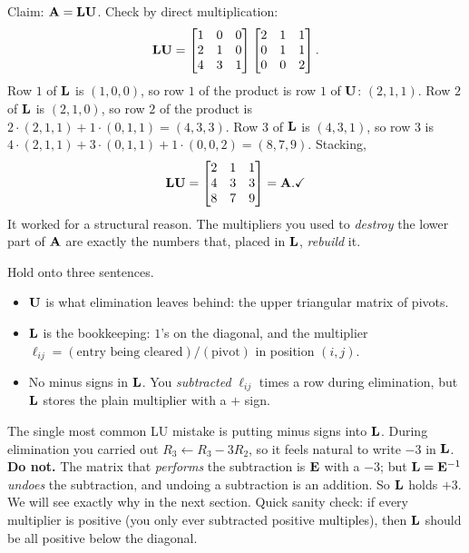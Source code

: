 Claim: $\mathbf{A} = \mathbf{L}\mathbf{U}$. Check by direct multiplication:
\[
  \mathbf{L}\mathbf{U}
  = \begin{bmatrix} 1 & 0 & 0 \\ 2 & 1 & 0 \\ 4 & 3 & 1 \end{bmatrix}
    \begin{bmatrix} 2 & 1 & 1 \\ 0 & 1 & 1 \\ 0 & 0 & 2 \end{bmatrix}.
\]
Row $1$ of $\mathbf{L}$ is $(1,0,0)$, so row $1$ of the product is row $1$ of $\mathbf{U}$:
$(2,1,1)$. Row $2$ of $\mathbf{L}$ is $(2,1,0)$, so row $2$ of the product is
$2\cdot(2,1,1) + 1\cdot(0,1,1) = (4,3,3)$. Row $3$ of $\mathbf{L}$ is $(4,3,1)$, so row $3$ is
$4\cdot(2,1,1) + 3\cdot(0,1,1) + 1\cdot(0,0,2) = (8,7,9)$. Stacking,
\[
  \mathbf{L}\mathbf{U} = \begin{bmatrix} 2 & 1 & 1 \\ 4 & 3 & 3 \\ 8 & 7 & 9 \end{bmatrix} = \mathbf{A}. \checkmark
\]
It worked for a structural reason. The multipliers you used to \emph{destroy} the
lower part of $\mathbf{A}$ are exactly the numbers that, placed in $\mathbf{L}$,
\emph{rebuild} it.

\begin{focusbox}
Hold onto three sentences.
\begin{itemize}
  \item $\mathbf{U}$ is what elimination leaves behind: the upper triangular matrix of pivots.
  \item $\mathbf{L}$ is the bookkeeping: $1$'s on the diagonal, and the multiplier
        $\ell_{ij}=(\text{entry being cleared})/(\text{pivot})$ in position $(i,j)$.
  \item No minus signs in $\mathbf{L}$. You \emph{subtracted} $\ell_{ij}$ times a row during
        elimination, but $\mathbf{L}$ stores the plain multiplier with a $+$ sign.
\end{itemize}
\end{focusbox}

\begin{trapbox}
The single most common LU mistake is putting minus signs into $\mathbf{L}$. During elimination
you carried out $R_3 \leftarrow R_3 - 3R_2$, so it feels natural to write $-3$ in $\mathbf{L}$.
\textbf{Do not.} The matrix that \emph{performs} the subtraction is $\mathbf{E}$ with a $-3$;
but $\mathbf{L} = \mathbf{E}^{-1}$ \emph{undoes} the subtraction, and undoing a subtraction is an
addition. So $\mathbf{L}$ holds $+3$. We will see exactly why in the next section. Quick sanity
check: if every multiplier is positive (you only ever subtracted positive multiples), then
$\mathbf{L}$ should be all positive below the diagonal.
\end{trapbox}

